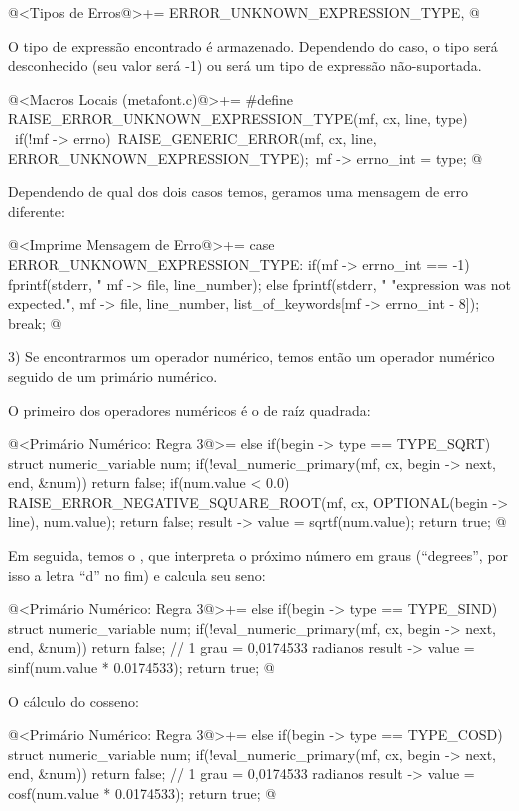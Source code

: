 \iniciocodigo
@<Tipos de Erros@>+=
ERROR_UNKNOWN_EXPRESSION_TYPE,
@
\fimcodigo

O tipo de expressão encontrado é armazenado. Dependendo do caso, o
tipo será desconhecido (seu valor será -1) ou será um tipo de
expressão não-suportada.

\iniciocodigo
@<Macros Locais (metafont.c)@>+=
#define RAISE_ERROR_UNKNOWN_EXPRESSION_TYPE(mf, cx, line, type) {\
  if(!mf -> errno){\
    RAISE_GENERIC_ERROR(mf, cx, line, ERROR_UNKNOWN_EXPRESSION_TYPE);\
    mf -> errno_int = type;}}
@
\fimcodigo

Dependendo de qual dos dois casos temos, geramos uma mensagem de erro
diferente:

\iniciocodigo
@<Imprime Mensagem de Erro@>+=
case ERROR_UNKNOWN_EXPRESSION_TYPE:
  if(mf -> errno_int == -1)
    fprintf(stderr, "%
            mf -> file, line_number);
  else
    fprintf(stderr, "%
                    "expression was not expected.", mf -> file, line_number,
                    list_of_keywords[mf -> errno_int - 8]);
  break;
@
\fimcodigo

3) Se encontrarmos um operador numérico, temos então um operador
numérico seguido de um primário numérico.

O primeiro dos operadores numéricos é o de raíz quadrada:

\iniciocodigo
@<Primário Numérico: Regra 3@>=
else if(begin -> type == TYPE_SQRT){
  struct numeric_variable num;
  if(!eval_numeric_primary(mf, cx, begin -> next, end, &num))
    return false;
  if(num.value < 0.0){
    RAISE_ERROR_NEGATIVE_SQUARE_ROOT(mf, cx, OPTIONAL(begin -> line),
                                    num.value);
    return false;
  }
  result -> value = sqrtf(num.value);
  return true;
}
@
\fimcodigo

Em seguida, temos o , que interpreta o próximo número
em graus (``degrees'', por isso a letra ``d'' no fim) e calcula seu
seno:

\iniciocodigo
@<Primário Numérico: Regra 3@>+=
else if(begin -> type == TYPE_SIND){
  struct numeric_variable num;
  if(!eval_numeric_primary(mf, cx, begin -> next, end, &num))
    return false;
  // 1 grau = 0,0174533 radianos
  result -> value = sinf(num.value * 0.0174533);
  return true;
}
@
\fimcodigo

O cálculo do cosseno:

\iniciocodigo
@<Primário Numérico: Regra 3@>+=
else if(begin -> type == TYPE_COSD){
  struct numeric_variable num;
  if(!eval_numeric_primary(mf, cx, begin -> next, end, &num))
    return false;
  // 1 grau = 0,0174533 radianos
  result -> value = cosf(num.value * 0.0174533);
  return true;
}
@
\fimcodigo

